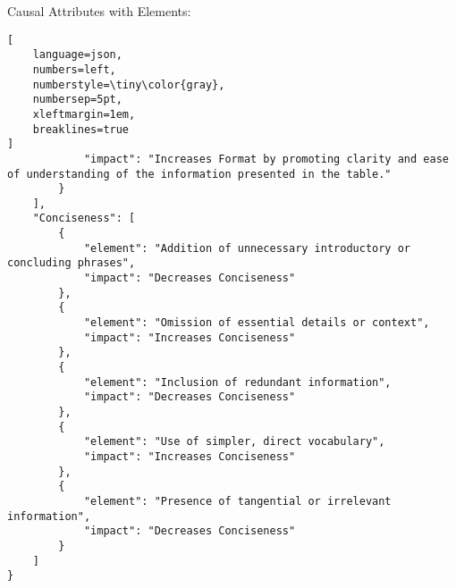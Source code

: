 \begin{promptbox}{Causal Attributes with Elements:}
\begin{lstlisting}[
    language=json,
    numbers=left,
    numberstyle=\tiny\color{gray},
    numbersep=5pt,
    xleftmargin=1em,
    breaklines=true
]
            "impact": "Increases Format by promoting clarity and ease of understanding of the information presented in the table."
        }
    ],
    "Conciseness": [
        {
            "element": "Addition of unnecessary introductory or concluding phrases",
            "impact": "Decreases Conciseness"
        },
        {
            "element": "Omission of essential details or context",
            "impact": "Increases Conciseness"
        },
        {
            "element": "Inclusion of redundant information",
            "impact": "Decreases Conciseness"
        },
        {
            "element": "Use of simpler, direct vocabulary",
            "impact": "Increases Conciseness"
        },
        {
            "element": "Presence of tangential or irrelevant information",
            "impact": "Decreases Conciseness"
        }
    ]
}
\end{lstlisting}
\end{promptbox}

